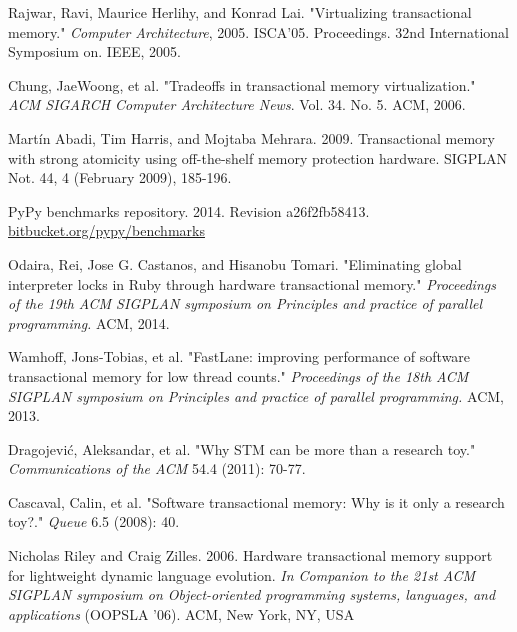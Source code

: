 \documentclass{sigplanconf}
\begin{document}
\begin{thebibliography}{}
 Rajwar, Ravi, Maurice Herlihy, and Konrad
  Lai. "Virtualizing transactional memory." \emph{Computer
    Architecture}, 2005. ISCA'05. Proceedings. 32nd International
  Symposium on. IEEE, 2005.

 Chung, JaeWoong, et al. "Tradeoffs in transactional
  memory virtualization." \emph{ACM SIGARCH Computer Architecture
  News}. Vol. 34. No. 5. ACM, 2006.

 Martín Abadi, Tim Harris, and Mojtaba
  Mehrara. 2009. Transactional memory with strong atomicity using
  off-the-shelf memory protection hardware. SIGPLAN Not. 44, 4 (February
  2009), 185-196.

 PyPy benchmarks repository. 2014. Revision
  a26f2fb58413. \url{bitbucket.org/pypy/benchmarks}





  Odaira, Rei, Jose G. Castanos, and Hisanobu Tomari.  "Eliminating
  global interpreter locks in Ruby through hardware transactional
  memory."  \emph{Proceedings of the 19th ACM SIGPLAN symposium on
    Principles and practice of parallel programming.} ACM, 2014.

  Wamhoff, Jons-Tobias, et al. "FastLane: improving performance of
  software transactional memory for low thread counts."
  \emph{Proceedings of the 18th ACM SIGPLAN symposium on Principles
    and practice of parallel programming.} ACM, 2013.

  Dragojević, Aleksandar, et al. "Why STM can be more than a research
  toy." \emph{Communications of the ACM} 54.4 (2011): 70-77.

  Cascaval, Calin, et al. "Software transactional memory: Why is it
  only a research toy?." \emph{Queue} 6.5 (2008): 40.

  Nicholas Riley and Craig Zilles. 2006. Hardware transactional memory
  support for lightweight dynamic language evolution. \emph{In
    Companion to the 21st ACM SIGPLAN symposium on Object-oriented
    programming systems, languages, and applications} (OOPSLA
  '06). ACM, New York, NY, USA


\end{thebibliography}
\end{document}
